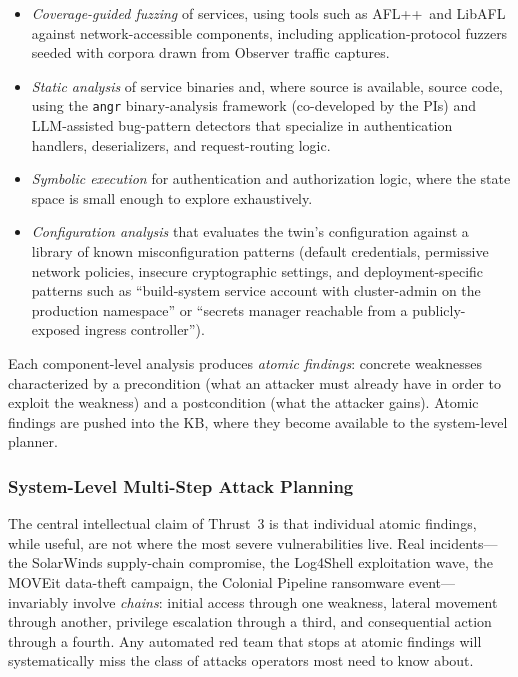 \begin{itemize}[leftmargin=1.3em,itemsep=0.1em,topsep=0.2em]
  \item \emph{Coverage-guided fuzzing} of services, using tools such
  as AFL++\ and LibAFL against network-accessible components, including
  application-protocol fuzzers seeded with corpora drawn from Observer
  traffic captures.
  \item \emph{Static analysis} of service binaries and, where source
  is available, source code, using the \texttt{angr} binary-analysis
  framework (co-developed by the PIs) and LLM-assisted bug-pattern
  detectors that specialize in authentication handlers, deserializers,
  and request-routing logic.
  \item \emph{Symbolic execution} for authentication and authorization
  logic, where the state space is small enough to explore exhaustively.
  \item \emph{Configuration analysis} that evaluates the twin's
  configuration against a library of known misconfiguration patterns
  (default credentials, permissive network policies, insecure
  cryptographic settings, and deployment-specific patterns such as
  ``build-system service account with cluster-admin on the production
  namespace'' or ``secrets manager reachable from a publicly-exposed
  ingress controller'').
\end{itemize}

Each component-level analysis produces \emph{atomic findings}: concrete
weaknesses characterized by a precondition (what an attacker must
already have in order to exploit the weakness) and a postcondition
(what the attacker gains). Atomic findings are pushed into the KB,
where they become available to the system-level planner.

\subsubsection{System-Level Multi-Step Attack Planning}

The central intellectual claim of Thrust~3 is that individual atomic
findings, while useful, are not where the most severe \cps
vulnerabilities live. Real incidents---the SolarWinds supply-chain
compromise, the Log4Shell exploitation wave, the MOVEit data-theft
campaign, the Colonial Pipeline ransomware event---invariably involve
\emph{chains}: initial access through one weakness, lateral movement
through another, privilege escalation through a third, and
consequential action through a fourth. Any automated red team that
stops at atomic findings will systematically miss the class of attacks
operators most need to know about.

